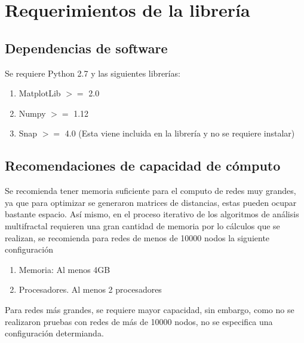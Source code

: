 \section{Requerimientos de la librería}


\subsection{Dependencias de software}

Se requiere Python 2.7 y las siguientes librerías:

\begin{enumerate}
    \item MatplotLib $>=$ 2.0
    \item Numpy $>=$ 1.12
    \item Snap $>=$ 4.0 (Esta viene incluida en la librería y no se requiere instalar)
\end{enumerate}

\subsection{Recomendaciones de capacidad de cómputo}

Se recomienda tener memoria suficiente para el computo de redes muy grandes, ya que para optimizar se generaron matrices de distancias, estas pueden ocupar bastante espacio. Así mismo, en el proceso iterativo de los algoritmos de análisis multifractal requieren una gran cantidad de memoria por lo cálculos que se realizan, se recomienda para redes de menos de 10000 nodos la siguiente configuración

\begin{enumerate}
    \item Memoria: Al menos 4GB
    \item Procesadores. Al menos 2 procesadores
\end{enumerate}

Para redes más grandes, se requiere mayor capacidad, sin embargo, como no se realizaron pruebas con redes de más de 10000 nodos, no se especifica una configuración determianda.